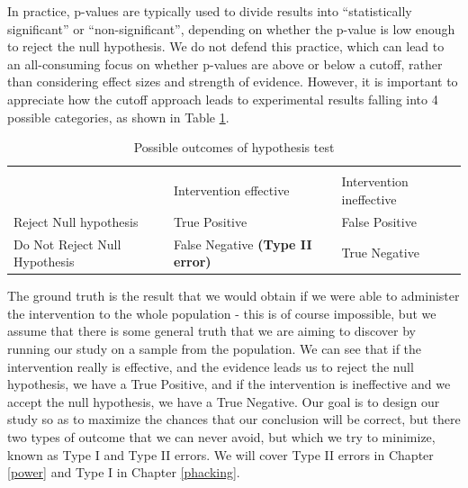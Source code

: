 \documentclass{krantz}
\begin{document}
In practice, p-values are typically used to divide results into ``statistically significant'' or ``non-significant'', depending on whether the p-value is low enough to reject the null hypothesis. We do not defend this practice, which can lead to an all-consuming focus on whether p-values are above or below a cutoff, rather than considering effect sizes and strength of evidence. However, it is important to appreciate how the cutoff approach leads to experimental results falling into 4 possible categories, as shown in Table \ref{tab:confusionMat}.

\begin{table}

\caption{\label{tab:confusionMat}Possible outcomes of hypothesis test}
\centering
\begin{tabular}[t]{>{\centering\arraybackslash}p{9em}>{\centering\arraybackslash}p{9em}>{\centering\arraybackslash}p{9em}}
\toprule
\multicolumn{1}{c}{ } & \multicolumn{2}{c}{Ground truth} \\
\cmidrule(l{3pt}r{3pt}){2-3}
 & Intervention effective & Intervention ineffective\\
\midrule
Reject Null hypothesis & True Positive & False Positive 
\textbf{\cellcolor{gray!6}{ (Type I error)}}\\
Do Not Reject Null Hypothesis & False Negative 
\textbf{ (Type II error)} & True Negative\\
\bottomrule
\end{tabular}
\end{table}

The ground truth is the result that we would obtain if we were able to administer the intervention to the whole population - this is of course impossible, but we assume that there is some general truth that we are aiming to discover by running our study on a sample from the population. We can see that if the intervention really is effective, and the evidence leads us to reject the null hypothesis, we have a True Positive, and if the intervention is ineffective and we accept the null hypothesis, we have a True Negative. Our goal is to design our study so as to maximize the chances that our conclusion will be correct, but there two types of outcome that we can never avoid, but which we try to minimize, known as Type I and Type II errors. We will cover Type II errors in Chapter \ref{power} and Type I in Chapter \ref{phacking}.
\end{document}
